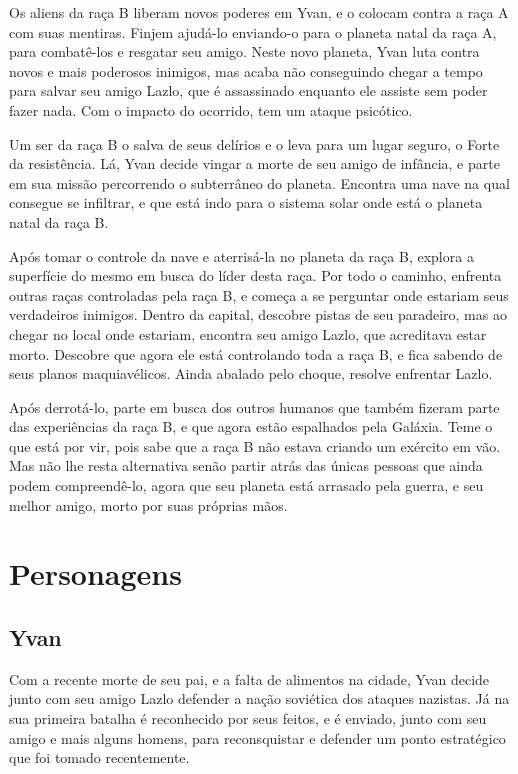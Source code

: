 \documentclass[12pt, a4paper]{article}
\begin{document}
    Os aliens da raça B liberam novos poderes em Yvan, e o colocam contra a raça A
    com suas mentiras. Finjem ajudá-lo enviando-o para o planeta natal da raça A,
    para combatê-los e resgatar seu amigo. Neste novo planeta, Yvan luta contra
    novos e mais poderosos inimigos, mas acaba não conseguindo chegar a tempo para
    salvar seu amigo Lazlo, que é assassinado enquanto ele assiste sem poder fazer
    nada. Com o impacto do ocorrido, tem um ataque psicótico.

    Um ser da raça B o salva de seus delírios e o leva para um lugar seguro, o Forte
    da resistência. Lá, Yvan decide vingar a morte de seu amigo de infância, e
    parte em sua missão percorrendo o subterrâneo do planeta. Encontra uma nave na
    qual consegue se infiltrar, e que está indo para o sistema solar onde está
    o planeta natal da raça B.

    Após tomar o controle da nave e aterrisá-la no planeta da raça B, explora
    a superfície do mesmo em busca do líder desta raça. Por todo o caminho, enfrenta
    outras raças controladas pela raça B, e começa a se perguntar onde estariam seus
    verdadeiros inimigos. Dentro da capital, descobre pistas de seu paradeiro, mas
    ao chegar no local onde estariam, encontra seu amigo Lazlo, que acreditava estar
    morto. Descobre que agora ele está controlando toda a raça B, e fica sabendo de
    seus planos maquiavélicos. Ainda abalado pelo choque, resolve enfrentar Lazlo.

    Após derrotá-lo, parte em busca dos outros humanos que também fizeram parte
    das experiências da raça B, e que agora estão espalhados pela Galáxia.
    Teme o que está por vir, pois sabe que a raça B não estava criando um exército
    em vão. Mas não lhe resta alternativa senão partir atrás das únicas pessoas que ainda
    podem compreendê-lo, agora que seu planeta está arrasado pela
    guerra, e seu melhor amigo, morto por suas próprias mãos.

\section{Personagens}
    \subsection{Yvan}
        Com a recente morte de seu pai, e a falta de alimentos na cidade, Yvan
        decide junto com seu amigo Lazlo defender a nação soviética dos ataques
        nazistas. Já na sua primeira batalha é reconhecido por seus feitos,
        e é enviado, junto com seu amigo e mais alguns homens, para reconsquistar
        e defender um ponto estratégico que foi tomado recentemente.
\end{document}
